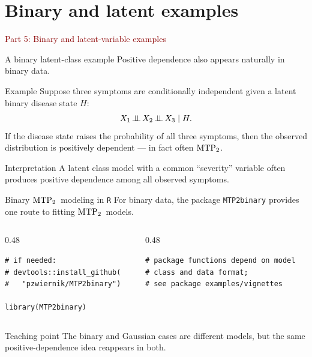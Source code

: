 \documentclass[dvipsnames,aspectratio=169,handout]{beamer}
\begin{document}
\section{Binary and latent examples}

\begin{frame}{}
\begin{center}
{\Huge \textcolor{DarkRed}{Part 5: Binary and latent-variable examples}}
\end{center}
\end{frame}

\begin{frame}{A binary latent-class example}
Positive dependence also appears naturally in binary data.

\begin{block}{Example}
Suppose three symptoms are conditionally independent given a latent binary disease state $H$:
\[
X_1 \mbox{\,$\perp\!\!\!\perp$\,} X_2 \mbox{\,$\perp\!\!\!\perp$\,} X_3 \mid H.
\]
If the disease state raises the probability of all three symptoms, then the observed distribution is positively dependent --- in fact often ${\rm MTP}_{2}$.
\end{block}

\begin{alertblock}{Interpretation}
A latent class model with a common “severity” variable often produces positive dependence among all observed symptoms.
\end{alertblock}
\end{frame}

\begin{frame}[fragile]{Binary ${\rm MTP}_{2}$\ modeling in \texttt{R}}
For binary data, the package \texttt{MTP2binary} provides one route to fitting ${\rm MTP}_{2}$\ models.

\begin{columns}[T,onlytextwidth]
\begin{column}{0.48\textwidth}
\begin{lstlisting}
# if needed:
# devtools::install_github(
#   "pzwiernik/MTP2binary")

library(MTP2binary)
\end{lstlisting}
\end{column}
\begin{column}{0.48\textwidth}
\begin{lstlisting}
# package functions depend on model
# class and data format;
# see package examples/vignettes
\end{lstlisting}
\end{column}
\end{columns}

\begin{alertblock}{Teaching point}
The binary and Gaussian cases are different models, but the same positive-dependence idea reappears in both.
\end{alertblock}
\end{frame}
\end{document}
